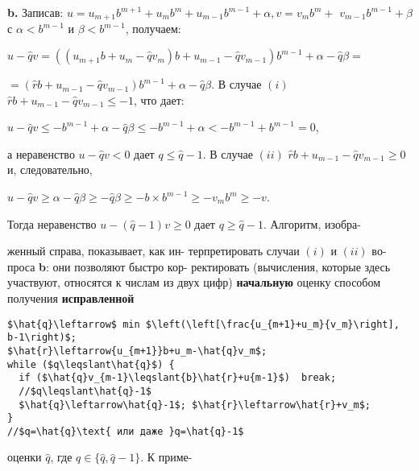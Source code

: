 \textbf{b.} Записав: $u=u_{m+1}b^{m+1}+u_mb^m+u_{m-1}b^{m-1}+\alpha, v=v_mb^m+$\linebreak
$v_{m-1}b^{m-1}+\beta$ с $\alpha<b^{m-1}$ и $\beta<b^{m-1}$, получаем:
\begin{center}
$u-\hat{q}v=((u_{m+1}b+u_m-\hat{q}v_m)b+u_{m-1}-\hat{q}v_{m-1})b^{m-1}+\alpha-\hat{q}\beta=$
\end{center}
\hspace*{80pt}$=(\hat{r}b+u_{m-1}-\hat{q}v_{m-1})b^{m-1}+\alpha-\hat{q}\beta$.\newline
В случае $(i)$ $\hat{r}b+u_{m-1}-\hat{q}v_{m-1}\leqslant-1$, что дает:
\begin{center}
$u-\hat{q}v\leqslant-b^{m-1}+\alpha-\hat{q}\beta\leqslant-b^{m-1}+\alpha<-b^{m-1}+b^{m-1}=0$,
\end{center}
а неравенство $u-\hat{q}v<0$ дает $q\leqslant\hat{q}-1$. В случае $(ii)$ $\hat{r}b+u_{m-1}-\hat{q}v_{m-1}\geqslant{0}$\linebreak
и, следовательно,
\begin{center}
$u-\hat{q}v\geqslant\alpha-\hat{q}\beta\geqslant-\hat{q}\beta\geqslant-b\times{b^{m-1}}\geqslant-v_mb^m\geqslant-v$.
\end{center}
Тогда неравенство $u-(\hat{q}-1)v\geqslant0$ дает $q\geqslant\hat{q}-1$. Алгоритм, изобра-\linebreak
\begin{multicols}{2}
\noindent
женный справа, показывает, как ин-\linebreak
терпретировать случаи $(i)$ и $(ii)$ во-\linebreak
проса \textbf{b}: они позволяют быстро кор-\linebreak
ректировать (вычисления, которые\linebreak
здесь участвуют, относятся к числам
из двух цифр) \textbf{начальную} оценку
способом получения \textbf{исправленной}\linebreak
\columnbreak
\begin{lstlisting}[mathescape=true, frame=l]
$\hat{q}\leftarrow$ min $\left(\left[\frac{u_{m+1}+u_m}{v_m}\right], b-1\right)$;
$\hat{r}\leftarrow{u_{m+1}}b+u_m-\hat{q}v_m$;
while ($q\leqslant\hat{q}$) {
  if ($\hat{q}v_{m-1}\leqslant{b}\hat{r}+u{m-1}$)  break;
  //$q\leqslant\hat{q}-1$
  $\hat{q}\leftarrow\hat{q}-1$; $\hat{r}\leftarrow\hat{r}+v_m$;
}
//$q=\hat{q}\text{ или даже }q=\hat{q}-1$
\end{lstlisting}
\end{multicols}
\noindent
оценки $\hat{q}$, где $q\in\{\hat{q},\hat{q}-1\}$. К приме-\linebreak
